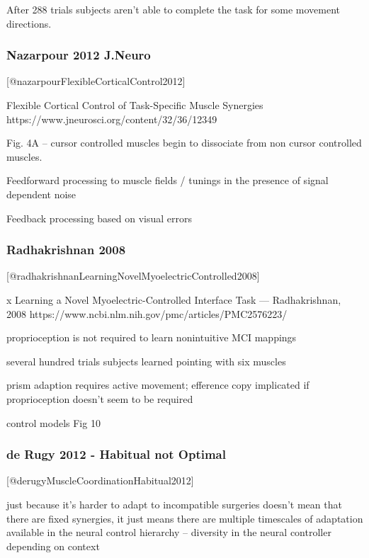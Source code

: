 \documentclass[../main.tex]{subfiles}
\begin{document}
After 288 trials subjects aren't able to complete the task for some movement directions.

\subsubsection{Nazarpour 2012 J.Neuro}\label{nazarpour-2012-j.neuro}

{[}@nazarpourFlexibleCorticalControl2012{]}

Flexible Cortical Control of Task-Specific Muscle Synergies https://www.jneurosci.org/content/32/36/12349

Fig. 4A -- cursor controlled muscles begin to dissociate from non cursor controlled muscles.

Feedforward processing to muscle fields / tunings in the presence of signal dependent noise

Feedback processing based on visual errors

\subsubsection{Radhakrishnan 2008}\label{radhakrishnan-2008}

{[}@radhakrishnanLearningNovelMyoelectricControlled2008{]}

x Learning a Novel Myoelectric-Controlled Interface Task --- Radhakrishnan, 2008 https://www.ncbi.nlm.nih.gov/pmc/articles/PMC2576223/

proprioception is not required to learn nonintuitive MCI mappings

several hundred trials subjects learned pointing with six muscles

prism adaption requires active movement; efference copy implicated if proprioception doesn't seem to be required

control models Fig 10

\subsubsection{de Rugy 2012 - Habitual not Optimal}\label{de-rugy-2012---habitual-not-optimal}

{[}@derugyMuscleCoordinationHabitual2012{]}

just because it's harder to adapt to incompatible surgeries doesn't mean that there are fixed synergies, it just means there are multiple timescales of adaptation available in the neural control hierarchy -- diversity in the neural controller depending on context
\end{document}

